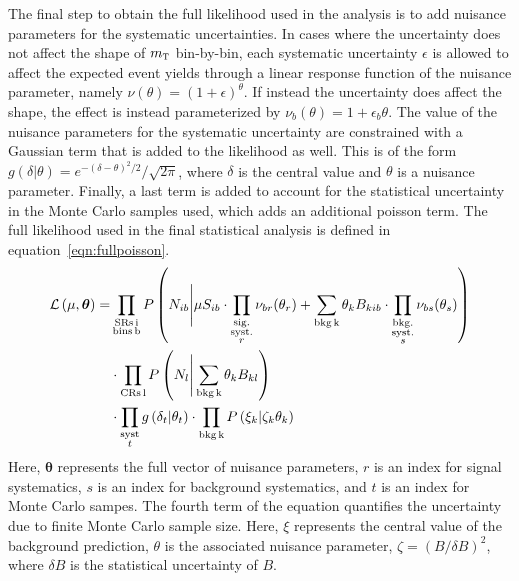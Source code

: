 The final step to obtain the full likelihood used in the analysis is to add nuisance parameters for the systematic uncertainties. In cases where the uncertainty does not affect the shape of $m_{\textrm{\footnotesize\sc t}}$ bin-by-bin, each systematic uncertainty $\epsilon$ is allowed to affect the expected event yields through a linear response function of the nuisance parameter, namely $\nu(\theta) = (1 + \epsilon)^\theta$. If instead the uncertainty does affect the shape, the effect is instead parameterized by $\nu_b(\theta) = 1 + \epsilon_{b}\theta$. The value of the nuisance parameters for the systematic uncertainty are constrained with a Gaussian term that is added to the likelihood as well. This is of the form $g(\delta | \theta) = e^{-(\delta - \theta)^2/2}/\sqrt{2\pi}$, where $\delta$ is the central value and $\theta$ is a nuisance parameter. Finally, a last term is added to account for the statistical uncertainty in the Monte Carlo samples used, which adds an additional poisson term. The full likelihood used in the final statistical analysis is defined in equation~\ref{eqn:fullpoisson}.
%
\begin{equation}
\begin{aligned}
\mathcal{L}\left(\mu, \hbox{\bm{$\theta$}}\right) = & \prod_{\substack{\rm{SRs }\, i \\ \rm{bins }\, b}} P\left(N_{ib} \Bigg| \mu S_{ib} \cdot \prod_{\substack{\rm{sig.} \\ \rm{syst.} \\ r}} \nu_{br}(\theta_{r})
 + \sum_{\rm{bkg }\, k}\theta_{k} B_{kib} \cdot \prod_{\substack{\rm{bkg.} \\ \rm{syst.} \\ s}} \nu_{bs}(\theta_{s}) \right)
 \\ & \cdot \prod_{\substack{\rm{CRs} \, l}} P\left(N_{l} \Bigg| \sum_{\rm{bkg }\, k}\theta_{k} B_{kl}\right)
 \\ & \cdot \prod_{\substack{\rm syst \\ t}} g\left(\delta_{t} | \theta_{t}\right)
 \cdot \prod_{\substack{\rm bkg \, k}} P\left(\xi_k | \zeta_{k} \theta_{k}\right)
\end{aligned}
\label{eqn:fullpoisson}
\end{equation}
%
Here, $\boldsymbol{\theta}$ represents the full vector of nuisance parameters, $r$ is an index for signal systematics, $s$ is an index for background systematics, and $t$ is an index for Monte Carlo sampes. The fourth term of the equation quantifies the uncertainty due to finite Monte Carlo sample size. Here, $\xi$ represents the central value of the background prediction, $\theta$ is the associated nuisance parameter, $\zeta = (B/\delta B)^2$, where $\delta B$ is the statistical uncertainty of $B$.

